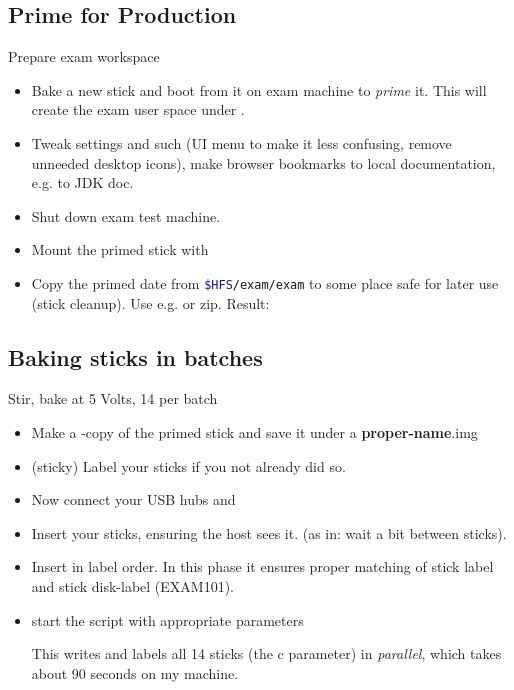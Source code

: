 \subsection[Production]{Prime for Production}
\begin{frame}{Prepare exam workspace}

  \begin{itemize}  \item Bake a new stick and boot from it on exam machine to \textit{prime} it. This
    will create the exam user space under .
  \item Tweak settings and such (UI menu to make it less confusing,
    remove unneeded desktop icons), make browser bookmarks to local
    documentation, e.g. to JDK doc.
  \item Shut down exam test machine.
  \item Mount the primed stick with 
    
  \item Copy  the primed  date from
    \lstinline[language=sh,basicstyle={\normalsize},morekeywords={exam,$HFS}]{$HFS/exam/exam} %
    to some place safe 
    for later use (stick cleanup). Use e.g.  or
    zip. Result: 
\end{itemize}
\end{frame}

\subsection[Baking]{Baking sticks in batches}
\begin{frame}[shrink]{Stir, bake at 5 Volts, 14 per batch}
  \begin{itemize}
  \item Make a -copy of the primed stick and save it under a
    {\ttfamily\textbf{proper-name}.img}
    
  \item (sticky) Label your sticks if you not already did so.
  \item Now connect your USB hubs and
  \item Insert your sticks, ensuring the host sees it. (as in: wait a
    bit between sticks).
  \item Insert in label
    order. In this phase it ensures proper matching of stick label and
    stick disk-label (EXAM101).
  \item start the  script with appropriate parameters
    
    This writes and labels all 14 sticks (the c parameter) in \textit{parallel},
    which takes about 90 seconds on my machine.
  \end{itemize}
\end{frame}

